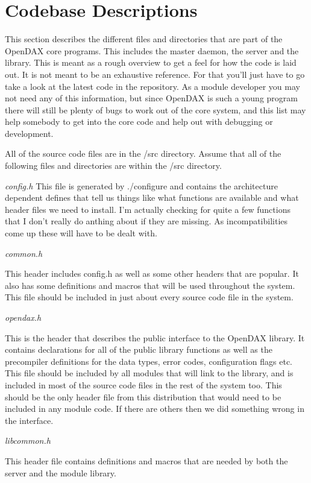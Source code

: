 \chapter{Codebase Descriptions}
This section describes the different files and directories that are part of the OpenDAX core programs.  This includes the master daemon, the server and the library.  This is meant as a rough overview to get a feel for how the code is laid out.  It is not meant to be an exhaustive reference.  For that you'll just have to go take a look at the latest code in the repository.  As a module developer you may not need any of this information, but since OpenDAX is such a young program there will still be plenty of bugs to work out of the core system, and this list may help somebody to get into the core code and help out with debugging or development.

All of the source code files are in the /src directory.  Assume that all of the following files and directories are within the /src directory.

\emph{config.h}
This file is generated by ./configure and contains the architecture dependent defines that tell us things like what functions are available and what header files we need to install. I'm actually checking for quite a few functions that I don't really do anthing about if they are missing. As incompatibilities come up these will have to be dealt with.

\emph{common.h}

This header includes config.h as well as some other headers that are popular. It also has some definitions and macros that will be used throughout the system. This file should be included in just about every source code file in the system.

\emph{opendax.h}

This is the header that describes the public interface to the OpenDAX library. It contains declarations for all of the public library functions as well as the precompiler definitions for the data types, error codes, configuration flags etc. This file should be included by all modules that will link to the library, and is included in most of the source code files in the rest of the system too. This should be the only header file from this distribution that would need to be included in any module code. If there are others then we did something wrong in the interface.

\emph{libcommon.h}

This header file contains definitions and macros that are needed by both the server and the module library.

